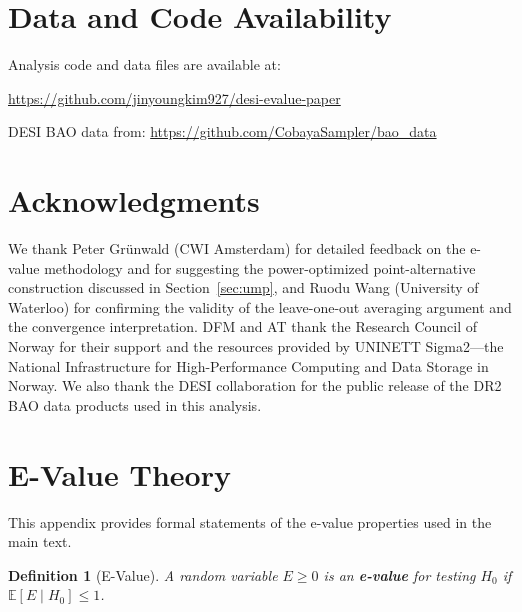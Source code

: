 \documentclass[11pt,a4paper]{article}
\newtheorem{definition}{Definition}
\newcommand{\E}{\mathbb{E}}
\begin{document}
\section*{Data and Code Availability}

Analysis code and data files are available at:
\begin{center}
\url{https://github.com/jinyoungkim927/desi-evalue-paper}
\end{center}

DESI BAO data from: \url{https://github.com/CobayaSampler/bao_data}

\section*{Acknowledgments}

We thank Peter Gr\"unwald (CWI Amsterdam) for detailed feedback on the e-value methodology and for suggesting the power-optimized point-alternative construction discussed in Section~\ref{sec:ump}, and Ruodu Wang (University of Waterloo) for confirming the validity of the leave-one-out averaging argument and the convergence interpretation. DFM and AT thank the Research Council of Norway for their support and the resources provided by UNINETT Sigma2---the National Infrastructure for High-Performance Computing and Data Storage in Norway. We also thank the DESI collaboration for the public release of the DR2 BAO data products used in this analysis.

\appendix
\section{E-Value Theory}
\label{app:proofs}

This appendix provides formal statements of the e-value properties used in the main text.

\begin{definition}[E-Value]
A random variable $E \geq 0$ is an \textbf{e-value} for testing $H_0$ if $\E[E \mid H_0] \leq 1$.
\end{definition}
\end{document}
